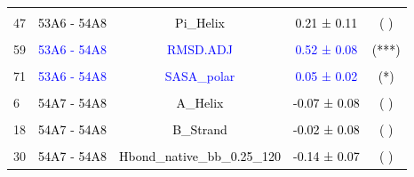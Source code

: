 \documentclass{article}\usepackage[table]{xcolor}
\renewcommand{\$}{$} %
\begin{document}
\begin{center}
\begin{longtable}[t]{lcccc}
\cellcolor{gray!6}{41} & \cellcolor{gray!6}{\textcolor{black}{53A6 - 54A8}} & \cellcolor{gray!6}{\textcolor{black}{NOE\_repl\_merged}} & \cellcolor{gray!6}{\textcolor{black}{0.08 ± 0.04}} & \cellcolor{gray!6}{\textcolor{black}{( )}}\\
47 & \textcolor{black}{53A6 - 54A8} & \textcolor{black}{Pi\_Helix} & \textcolor{black}{0.21 ± 0.11} & \textcolor{black}{( )}\\
\cellcolor{gray!6}{53} & \cellcolor{gray!6}{\textcolor{black}{53A6 - 54A8}} & \cellcolor{gray!6}{\textcolor{black}{Rgyr}} & \cellcolor{gray!6}{\textcolor{black}{0.01 ± 0.00}} & \cellcolor{gray!6}{\textcolor{black}{( )}}\\
59 & \textcolor{blue}{53A6 - 54A8} & \textcolor{blue}{RMSD.ADJ} & \textcolor{blue}{0.52 ± 0.08} & \textcolor{black}{(***)}\\
\cellcolor{gray!6}{65} & \cellcolor{gray!6}{\textcolor{black}{53A6 - 54A8}} & \cellcolor{gray!6}{\textcolor{black}{SASA\_nonpolar}} & \cellcolor{gray!6}{\textcolor{black}{0.01 ± 0.01}} & \cellcolor{gray!6}{\textcolor{black}{( )}}\\
71 & \textcolor{blue}{53A6 - 54A8} & \textcolor{blue}{SASA\_polar} & \textcolor{blue}{0.05 ± 0.02} & \textcolor{black}{(*)}\\
\cellcolor{gray!6}{77} & \cellcolor{gray!6}{\textcolor{black}{53A6 - 54A8}} & \cellcolor{gray!6}{\textcolor{black}{ThreeTen\_Helix}} & \cellcolor{gray!6}{\textcolor{black}{-0.18 ± 0.08}} & \cellcolor{gray!6}{\textcolor{black}{( )}}\\
6 & \textcolor{black}{54A7 - 54A8} & \textcolor{black}{A\_Helix} & \textcolor{black}{-0.07 ± 0.08} & \textcolor{black}{( )}\\
\cellcolor{gray!6}{12} & \cellcolor{gray!6}{\textcolor{black}{54A7 - 54A8}} & \cellcolor{gray!6}{\textcolor{black}{B\_Bridge}} & \cellcolor{gray!6}{\textcolor{black}{0.02 ± 0.05}} & \cellcolor{gray!6}{\textcolor{black}{( )}}\\
18 & \textcolor{black}{54A7 - 54A8} & \textcolor{black}{B\_Strand} & \textcolor{black}{-0.02 ± 0.08} & \textcolor{black}{( )}\\
\cellcolor{gray!6}{24} & \cellcolor{gray!6}{\textcolor{black}{54A7 - 54A8}} & \cellcolor{gray!6}{\textcolor{black}{Hbond\_bb\_0.25\_120}} & \cellcolor{gray!6}{\textcolor{black}{-0.06 ± 0.05}} & \cellcolor{gray!6}{\textcolor{black}{( )}}\\
30 & \textcolor{black}{54A7 - 54A8} & \textcolor{black}{Hbond\_native\_bb\_0.25\_120} & \textcolor{black}{-0.14 ± 0.07} & \textcolor{black}{( )}\\

\end{longtable}
\end{center}
\end{document}
